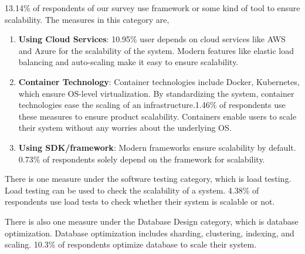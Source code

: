  13.14\% of respondents of our survey use framework or some kind of tool to ensure scalability. The measures in this category are,
\begin{enumerate}[label=(\alph*)]

    \item \textbf{Using Cloud Services}: 10.95\% user depends on cloud services like AWS and Azure for the scalability of the system. Modern features like elastic load balancing and auto-scaling make it easy to ensure scalability.
    
    \item \textbf{Container Technology}: Container technologies include Docker, Kubernetes, which ensure OS-level virtualization. By standardizing the system, container technologies ease the scaling of an infrastructure.1.46\% of respondents use these measures to ensure product scalability. Containers enable users to scale their system without any worries about the underlying OS.
    
    \item \textbf{Using SDK/framework}: Modern frameworks ensure scalability by default. 0.73\% of respondents solely depend on the framework for scalability.
  
\end{enumerate}
 
 
There is one measure under the software testing category, which is load testing. Load testing can be used to check the scalability of a system. 4.38\% of respondents use load tests to check whether their system is scalable or not.

There is also one measure under the Database Design category, which is database optimization. Database optimization includes sharding, clustering, indexing, and scaling. 10.3\% of respondents optimize database to scale their system.
